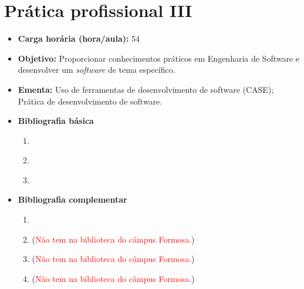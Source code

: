 \documentclass[
	10pt,				%
	openright,			%
	twoside,			%
	a4paper,			%
	english,			%
	french,				%
	brazil,				%
	sumario=tradicional
]{abntex2}
\begin{document}
\section*{Prática profissional III}\label{5_lab}
\begin{itemize}
	\item \textbf{Carga horária (hora/aula):} 54
	\item \textbf{Objetivo:} Proporcionar conhecimentos práticos em Engenharia de Software e desenvolver um \textit{software} de tema específico.
	\item \textbf{Ementa:}
	Uso de ferramentas de desenvolvimento de software (CASE);
	Prática de desenvolvimento de software.
	\item \textbf{Bibliografia básica}
	\begin{enumerate}
		\item \cite{sommerville2011engenharia}
		\item \cite{pressman2016engenharia}
		\item \cite{de2003engenharia}
	\end{enumerate}
	\item \textbf{Bibliografia complementar}
	\begin{enumerate}
		\item \cite{wazlawick2011analise}
		\item \cite{prikladnicki2014metodos}(\textcolor{red}{Não tem na biblioteca do câmpus Formosa.})
		\item \cite{hirama2012engenharia}(\textcolor{red}{Não tem na biblioteca do câmpus Formosa.})
		\item \cite{engholm2010engenharia}(\textcolor{red}{Não tem na biblioteca do câmpus Formosa.})
	\end{enumerate} 
\end{itemize}



\newpage
\end{document}
